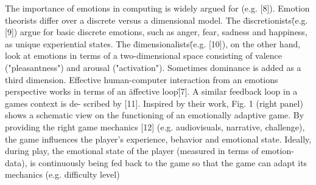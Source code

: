 \documentclass{uofsthesis-cs}
\begin{document}
The importance of emotions in computing is widely argued for (e.g. [8]). Emotion theorists differ over a discrete versus a dimensional model. The \"discretionists\" (e.g. [9]) argue for basic discrete emotions, such as anger, fear, sadness and happiness, as unique experiential states. The \"dimensionalists\" (e.g. [10]), on the other hand, look at emotions in terms of a two-dimensional space consisting of valence ("pleasantness") and arousal ("activation"). Sometimes dominance is added as a third dimension.  Effective human-computer interaction from an emotions perspective works in terms of an \"affective loop\" [7]. A similar feedback loop in a games context is de- scribed by [11]. Inspired by their work, Fig. 1 (right panel) shows a schematic view on the functioning of an emotionally adaptive game. By providing the right game mechanics [12] (e.g. audiovisuals, narrative, challenge), the game influences the player's experience, behavior and emotional state. Ideally, during play, the emotional state of the player (measured in terms of emotion-data), is continuously being fed back to the game so that the game can adapt its mechanics (e.g. difficulty level)
\end{document}
